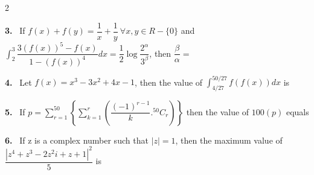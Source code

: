 \documentclass[10pt]{extarticle}
\newcommand{\qn}[1]{\par\smallskip\noindent\textbf{#1.}~}
\begin{document}
\begin{multicols}{2}
\qn{3} If $f(x)+f(y)=\dfrac1x+\dfrac1y\ \forall x,y\in R-\{0\}$ and $\displaystyle\int_2^3\dfrac{3(f(x))^5-f(x)}{1-(f(x))^4}dx=\dfrac12\log\dfrac{2^\alpha}{3^\beta}$, then $\dfrac\beta\alpha=$

\qn{4} Let $f(x)=x^3-3x^2+4x-1$, then the value of $\displaystyle\int_{4/27}^{50/27}f(f(x))dx$ is

\qn{5} If $p=\displaystyle\sum_{r=1}^{50}\left\{\sum_{k=1}^{r}\left(\dfrac{(-1)^{r-1}}k.{}^{50}C_r\right)\right\}$ then the value of $100(p)$ equals

\qn{6} If z is a complex number such that $|z|=1$, then the maximum value of $\dfrac{\left|z^4+z^3-2z^2i+z+1\right|^2}5$ is

\end{multicols}
\end{document}
